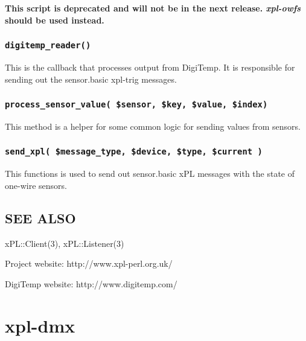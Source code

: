 \textbf{This script is deprecated and will not be in the next release.
\emph{xpl-owfs} should be used instead.}

\subsubsection*{\texttt{digitemp\_reader()}\label{xpl-digitemp_digitemp_reader_}}


This is the callback that processes output from DigiTemp.  It is
responsible for sending out the sensor.basic xpl-trig messages.

\subsubsection*{\texttt{process\_sensor\_value( \$sensor, \$key, \$value, \$index)}\label{xpl-digitemp_process_sensor_value_sensor_key_value_index_}}


This method is a helper for some common logic for sending values
from sensors.

\subsubsection*{\texttt{send\_xpl( \$message\_type, \$device, \$type, \$current )}\label{xpl-digitemp_send_xpl_message_type_device_type_current_}}


This functions is used to send out sensor.basic xPL messages with
the state of one-wire sensors.

\subsection*{SEE ALSO\label{xpl-digitemp_SEE_ALSO}}


xPL::Client(3), xPL::Listener(3)



Project website: http://www.xpl-perl.org.uk/



DigiTemp website: http://www.digitemp.com/

\section{xpl-dmx\label{xpl-dmx}}


